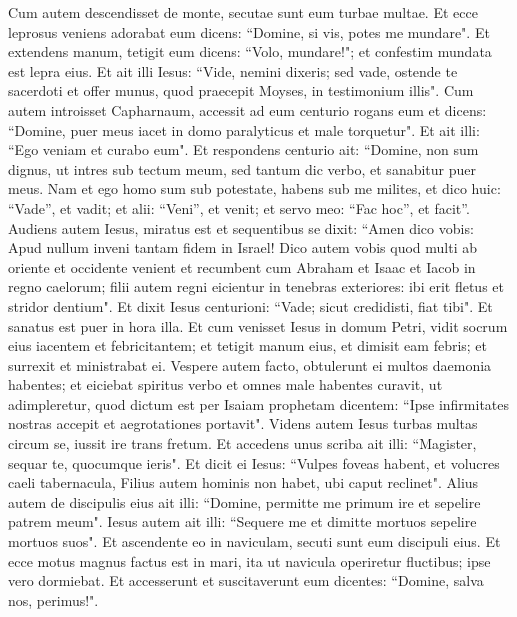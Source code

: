 \begin{biblechapter}  
\verse Cum autem descendisset de monte, secutae sunt eum turbae multae. 
\verse Et ecce leprosus veniens adorabat eum dicens: “Domine, si vis, potes me mundare". 
\verse Et extendens manum, tetigit eum dicens: “Volo, mundare!"; et confestim mundata est lepra eius. 
\verse Et ait illi Iesus: “Vide, nemini dixeris; sed vade, ostende te sacerdoti et offer munus, quod praecepit Moyses, in testimonium illis". 
\verse Cum autem introisset Capharnaum, accessit ad eum centurio rogans eum 
\verse et dicens: “Domine, puer meus iacet in domo paralyticus et male torquetur". 
\verse Et ait illi: “Ego veniam et curabo eum". 
\verse Et respondens centurio ait: “Domine, non sum dignus, ut intres sub tectum meum, sed tantum dic verbo, et sanabitur puer meus. 
\verse Nam et ego homo sum sub potestate, habens sub me milites, et dico huic: “Vade”, et vadit; et alii: “Veni”, et venit; et servo meo: “Fac hoc”, et facit”. 
\verse Audiens autem Iesus, miratus est et sequentibus se dixit: “Amen dico vobis: Apud nullum inveni tantam fidem in Israel! 
\verse Dico autem vobis quod multi ab oriente et occidente venient et recumbent cum Abraham et Isaac et Iacob in regno caelorum; 
\verse filii autem regni eicientur in tenebras exteriores: ibi erit fletus et stridor dentium". 
\verse Et dixit Iesus centurioni: “Vade; sicut credidisti, fiat tibi". Et sanatus est puer in hora illa. 
\verse Et cum venisset Iesus in domum Petri, vidit socrum eius iacentem et febricitantem; 
\verse et tetigit manum eius, et dimisit eam febris; et surrexit et ministrabat ei. 
\verse Vespere autem facto, obtulerunt ei multos daemonia habentes; et eiciebat spiritus verbo et omnes male habentes curavit, 
\verse ut adimpleretur, quod dictum est per Isaiam prophetam dicentem: “Ipse infirmitates nostras accepit et aegrotationes portavit". 
\verse Videns autem Iesus turbas multas circum se, iussit ire trans fretum. 
\verse Et accedens unus scriba ait illi: “Magister, sequar te, quocumque ieris".  
\verse Et dicit ei Iesus: “Vulpes foveas habent, et volucres caeli tabernacula, Filius autem hominis non habet, ubi caput reclinet". 
\verse Alius autem de discipulis eius ait illi: “Domine, permitte me primum ire et sepelire patrem meum". 
\verse Iesus autem ait illi: “Sequere me et dimitte mortuos sepelire mortuos suos". 
\verse Et ascendente eo in naviculam, secuti sunt eum discipuli eius. 
\verse Et ecce motus magnus factus est in mari, ita ut navicula operiretur fluctibus; ipse vero dormiebat. 
\verse Et accesserunt et suscitaverunt eum dicentes: “Domine, salva nos, perimus!". 

\end{biblechapter}
